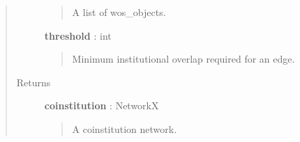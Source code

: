 \documentclass[letterpaper,10pt,english]{sphinxmanual}
\begin{document}
\begin{fulllineitems}
\begin{quote}
\begin{description}
\begin{quote}
A list of wos\_objects.
\end{quote}

\textbf{threshold} : int
\begin{quote}

Minimum institutional overlap required for an edge.
\end{quote}

\item[{Returns }] \leavevmode
\textbf{coinstitution} : NetworkX 
\begin{quote}

A coinstitution network.
\end{quote}

\end{description}\end{quote}

\end{fulllineitems}

\end{document}
